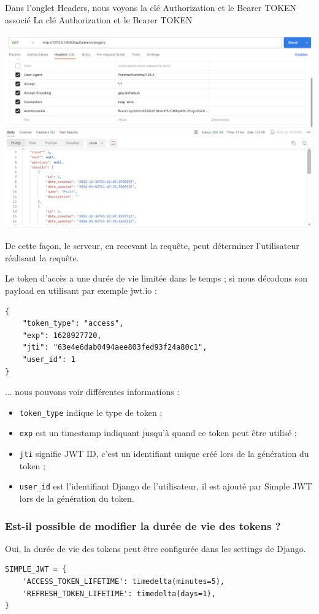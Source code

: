 \documentclass[a4paper]{article}
\begin{document}
Dans l’onglet Headers, nous voyons la clé Authorization et le Bearer TOKEN associé
La clé Authorization et le Bearer TOKEN
\begin{center}
\includegraphics[width=15cm]{images/image25.png}
\end{center}

De cette façon, le serveur, en recevant la requête, peut déterminer l’utilisateur réalisant la requête.

Le token d’accès a une durée de vie {\color{monOrange}limitée dans le temps} ; si nous décodons son payload en utilisant par exemple jwt.io :
\begin{verbatim}
{
    "token_type": "access",
    "exp": 1628927720,
    "jti": "63e4e6dab0494aee803fed93f24a80c1",
    "user_id": 1
}
\end{verbatim}

... nous pouvons voir différentes informations :
\begin{itemize}
\item {\tt token\_type}  indique le type de token ;
\item {\tt exp}  est un timestamp indiquant jusqu’à quand ce token peut être utilisé ;
\item {\tt jti}  signifie JWT ID, c’est un identifiant unique créé lors de la génération du token ;
\item {\tt user\_id}  est l’identifiant Django de l’utilisateur, il est ajouté par Simple JWT lors de la génération du token.
\end{itemize}

\subsubsection*{Est-il possible de modifier la durée de vie des tokens ?}
Oui, la durée de vie des tokens peut être configurée dans les settings de Django.
\begin{verbatim}
SIMPLE_JWT = {
    'ACCESS_TOKEN_LIFETIME': timedelta(minutes=5),
    'REFRESH_TOKEN_LIFETIME': timedelta(days=1),
}
\end{verbatim}
\end{document}
